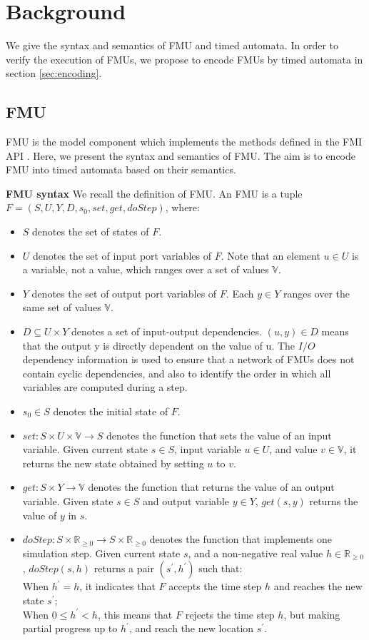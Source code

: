 \section{Background}
\label{sec:fmi}
We give the syntax and semantics of FMU and timed automata. In order to verify the execution of FMUs, we propose to encode FMUs by timed automata in section \ref{sec:encoding}. 

\subsection{FMU}
FMU is the model component which implements the methods defined in the FMI API \cite{Tripakis15}. Here, we present the syntax and semantics of FMU. The aim is to encode FMU into timed automata based on their semantics.
\begin{definition}
\textbf{FMU syntax}
We recall the definition of FMU. An FMU is a tuple $F=(S,U,Y,D,s_{0},set,get,doStep)$, where:
\end{definition}
\begin{itemize}
\item
$S$ denotes the set of states of $F$. 
\item
$U$ denotes the set of input port variables of $F$. Note that an element $u \in U$ is a variable, not a value, which ranges over a set of values $\mathbb{V}$. 
\item
$Y$ denotes the set of output port variables of $F$. Each $y \in Y$ ranges over the same set of values $\mathbb{V}$.
\item
$D \subseteq U \times Y$ denotes a set of input-output dependencies. $(u,y) \in D $ means that the output y is directly dependent on the value of u. The $I/O$ dependency information is used to ensure that a network of FMUs does not contain cyclic dependencies, and also to identify the order in which all variables are computed during a step.
\item
$s_{0} \in S$ denotes the initial state of $F$.
\item
$set : S \times U \times \mathbb{V} \rightarrow S$ denotes the function that sets the value of an input variable. Given current state $s \in S$, input variable $u \in U$, and value $v \in \mathbb{V}$, it returns the new state obtained by setting $u$ to $v$.
\item
$get : S \times Y \rightarrow \mathbb{V}$ denotes the function that returns the value of an output variable. Given state $s \in S$ and output variable $y \in Y$, $get(s,y)$ returns the value of $y$ in $s$.
\item
$doStep : S \times \mathbb{R}_{\geqslant{0}} \rightarrow S \times \mathbb{R}_{\geqslant{0}}$ denotes the function that implements one simulation step. Given current state $s$, and a non-negative real value $h \in \mathbb{R}_{\geqslant{0}}$, $doStep(s,h)$ returns a pair $(s^{\prime},h^{\prime})$ such that:
\\
When $h^{\prime} = h$, it indicates that $F$ accepts the time step $h$ and reaches the new state $s^{\prime}$;
\\
When $0 \leqslant h^{\prime} < h$, this means that $F$ rejects the time step $h$, but making partial progress up to $h^{\prime}$, and reach the new location $s^{\prime}$.
\end{itemize}
